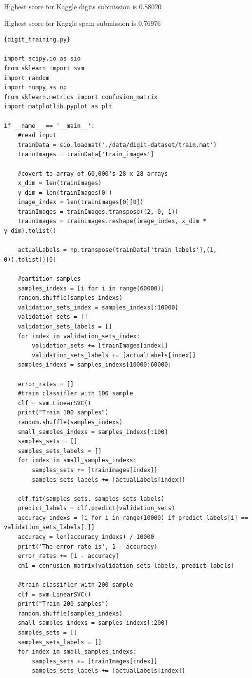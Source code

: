 \documentclass[11pt]{article}
\begin{document}
Highest score for Kaggle digits submission is 0.88020

Highest score for Kaggle spam submission is 0.76976


\newpage
\begin{lstlisting}
{digit_training.py}

import scipy.io as sio
from sklearn import svm
import random
import numpy as np
from sklearn.metrics import confusion_matrix
import matplotlib.pyplot as plt

if __name__ == '__main__':
	#read input
	trainData = sio.loadmat('./data/digit-dataset/train.mat')
	trainImages = trainData['train_images']

	#covert to array of 60,000's 28 x 28 arrays
	x_dim = len(trainImages)
	y_dim = len(trainImages[0])
	image_index = len(trainImages[0][0])
	trainImages = trainImages.transpose((2, 0, 1))
	trainImages = trainImages.reshape(image_index, x_dim * y_dim).tolist()

	actualLabels = np.transpose(trainData['train_labels'],(1, 0)).tolist()[0]

	#partition samples
	samples_indexs = [i for i in range(60000)]
	random.shuffle(samples_indexs)
	validation_sets_index = samples_indexs[:10000]
	validation_sets = []
	validation_sets_labels = []
	for index in validation_sets_index:
		validation_sets += [trainImages[index]]
		validation_sets_labels += [actualLabels[index]]
	samples_indexs = samples_indexs[10000:60000]

	error_rates = []
	#train classifler with 100 sample
	clf = svm.LinearSVC()
	print("Train 100 samples")
	random.shuffle(samples_indexs)
	small_samples_indexs = samples_indexs[:100]
	samples_sets = []
	samples_sets_labels = []
	for index in small_samples_indexs:
		samples_sets += [trainImages[index]]
		samples_sets_labels += [actualLabels[index]]

	clf.fit(samples_sets, samples_sets_labels)
	predict_labels = clf.predict(validation_sets)
	accuracy_indexs = [i for i in range(10000) if predict_labels[i] == validation_sets_labels[i]]
	accuracy = len(accuracy_indexs) / 10000
	print('The error rate is', 1 - accuracy)
	error_rates += [1 - accuracy]
	cm1 = confusion_matrix(validation_sets_labels, predict_labels)

	#train classifler with 200 sample
	clf = svm.LinearSVC()
	print("Train 200 samples")
	random.shuffle(samples_indexs)
	small_samples_indexs = samples_indexs[:200]
	samples_sets = []
	samples_sets_labels = []
	for index in small_samples_indexs:
		samples_sets += [trainImages[index]]
		samples_sets_labels += [actualLabels[index]]


\end{lstlisting}
\end{document}
